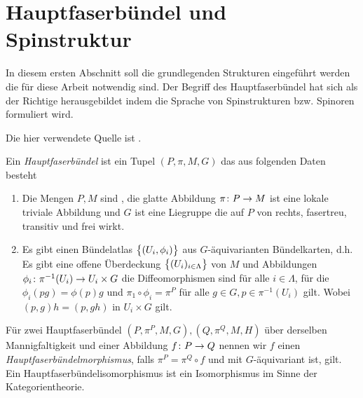 

\section{Hauptfaserbündel und Spinstruktur}
\label{sec:Hauptfaserbündel und Spinstruktur}

In diesem ersten Abschnitt soll die grundlegenden Strukturen
eingeführt werden die für diese Arbeit notwendig sind. Der Begriff des
Hauptfaserbündel hat sich als der Richtige herausgebildet indem die
Sprache von Spinstrukturen bzw. Spinoren formuliert wird.

Die hier verwendete Quelle ist \cite{baum09}.

\begin{Def}[Hauptfaserbündel]
  Ein \textit{Hauptfaserbündel} ist ein Tupel $(P,\pi,M,G)$ das aus
  folgenden Daten besteht
	\begin{enumerate}[\textbullet]
        \item Die Mengen $P,M$ sind \mfgen, die glatte Abbildung
          $ \pi \colon P \rightarrow M $ ist eine lokale triviale Abbildung und
          $G$ ist eine Liegruppe die auf $P$ von rechts, fasertreu,
          transitiv und frei wirkt.   
        \item Es gibt einen Bündelatlas $\bigl\{ (U_i,\phi_i) \bigr\}$ aus
          $G$-äquivarianten Bündelkarten, d.h.  Es gibt
           eine offene Überdeckung $\bigl\{ (U_i)_{i \in \Lambda} \bigr\}$ von $ M $ und  Abbildungen
          $ \phi_i \colon \pi^{-1}(U_i) \rightarrow U_i\times G $ die
          Diffeomorphismen sind für alle $i \in \Lambda $, für die
          $ \phi_i(pg) = \phi(p) g $ und
          $ \pi_1 \circ \phi_i = \pi^P $ für alle
          $ g \in G, p \in \pi^{-1}(U_i) $ gilt. Wobei
          $ (p,g) h = (p,gh) $ in $ U_i\times G $ gilt.
	\end{enumerate}		
	Für zwei Hauptfaserbündel $(P,\pi^P,M,G),(Q,\pi^Q,M,H)$ über
        derselben Mannigfaltigkeit und einer Abbildung $f \colon P \rightarrow Q$
        nennen wir $f$ einen \textit{Hauptfaserbündelmorphismus},
        falls $ \pi^P=\pi^Q \circ f $ und mit $ G $-äquivariant ist, gilt. Ein Hauptfaserbündelisomorphismus ist ein Isomorphismus im Sinne
        der Kategorientheorie.
\end{Def}

